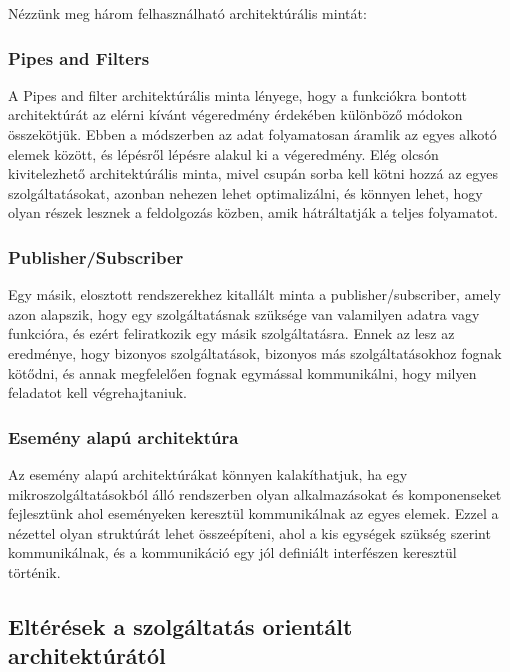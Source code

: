 \documentclass[11pt,magyar,a4paper,twoside,]{report}
\begin{document}
Nézzünk meg három felhasználható architektúrális mintát:

\subsubsection{Pipes and Filters}\label{pipes-and-filters}

A Pipes and filter architektúrális minta\citep{pipes-pattern} lényege,
hogy a funkciókra bontott architektúrát az elérni kívánt végeredmény
érdekében különböző módokon összekötjük. Ebben a módszerben az adat
folyamatosan áramlik az egyes alkotó elemek között, és lépésről lépésre
alakul ki a végeredmény. Elég olcsón kivitelezhető architektúrális
minta, mivel csupán sorba kell kötni hozzá az egyes szolgáltatásokat,
azonban nehezen lehet optimalizálni, és könnyen lehet, hogy olyan részek
lesznek a feldolgozás közben, amik hátráltatják a teljes folyamatot.

\subsubsection{Publisher/Subscriber}\label{publishersubscriber}

Egy másik, elosztott rendszerekhez kitallált minta a
publisher/subscriber\citep{pub-subscribed}, amely azon alapszik, hogy
egy szolgáltatásnak szüksége van valamilyen adatra vagy funkcióra, és
ezért feliratkozik egy másik szolgáltatásra. Ennek az lesz az eredménye,
hogy bizonyos szolgáltatások, bizonyos más szolgáltatásokhoz fognak
kötődni, és annak megfelelően fognak egymással kommunikálni, hogy milyen
feladatot kell végrehajtaniuk.

\subsubsection{Esemény alapú
architektúra}\label{esemuxe9ny-alapuxfa-architektuxfara}

Az esemény alapú architektúrákat\citep{event-driven-pattern} könnyen
kalakíthatjuk, ha egy mikroszolgáltatásokból álló rendszerben olyan
alkalmazásokat és komponenseket fejlesztünk ahol eseményeken keresztül
kommunikálnak az egyes elemek. Ezzel a nézettel olyan struktúrát lehet
összeépíteni, ahol a kis egységek szükség szerint kommunikálnak, és a
kommunikáció egy jól definiált interfészen keresztül történik.

\subsection{Eltérések a szolgáltatás orientált
architektúrától}\label{eltuxe9ruxe9sek-a-szolguxe1ltatuxe1s-orientuxe1lt-architektuxfaruxe1tuxf3l}
\end{document}
